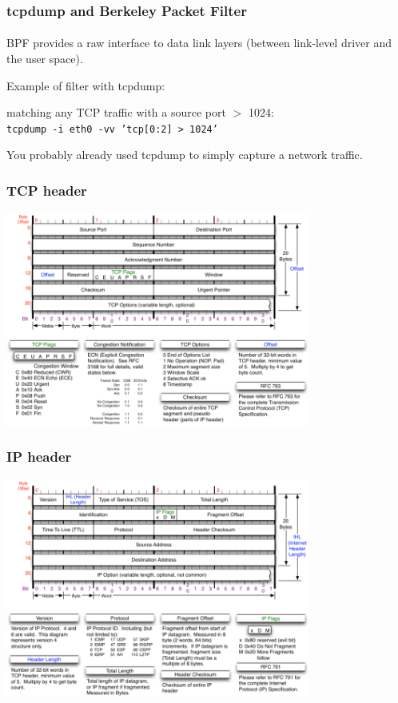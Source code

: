 \documentclass[]{beamer}
\begin{document}
\begin{frame}
\frametitle{tcpdump and Berkeley Packet Filter}
\framesubtitle{}

BPF provides a raw interface to data link layers (between link-level driver and the user space).

\bigskip

Example of filter with tcpdump:


\hspace{1cm}matching any TCP traffic with a source port $>$ 1024:\\
\hspace{2cm}\texttt{tcpdump -i eth0 -vv 'tcp[0:2] > 1024'}

\bigskip

You probably already used tcpdump to simply capture a network traffic.
\end{frame}

\begin{frame}
\frametitle{TCP header}
\begin{center}
\includegraphics[width=10.0cm]{./images/TCP-Header.png}
\end{center}
\end{frame}


\begin{frame}
\frametitle{IP header}
\begin{center}
\includegraphics[width=10.0cm]{./images/IP-Header.png}
\end{center}
\end{frame}
\end{document}
